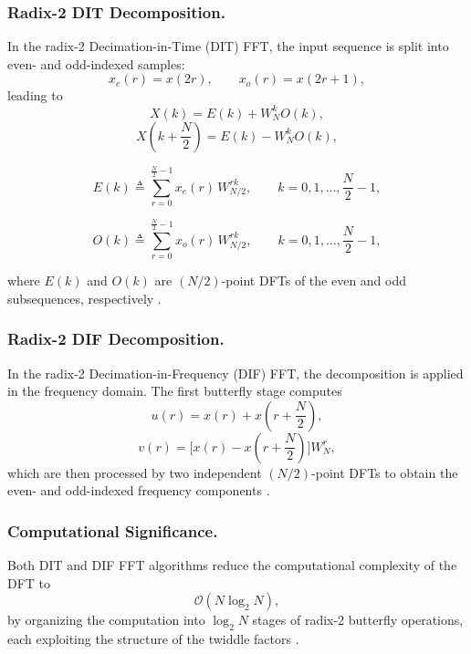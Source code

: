 \subsubsection{Radix-2 DIT Decomposition.}
In the radix-2 Decimation-in-Time (DIT) FFT, the input sequence is split into even- and odd-indexed samples:
\begin{equation}
x_e(r) = x(2r), \qquad
x_o(r) = x(2r+1),
\label{eq:dit_even_odd}
\end{equation}
leading to
\begin{equation}
X(k) = E(k) + W_N^k O(k),
\label{eq:dit_basic}
\end{equation}
\begin{equation}
X\!\left(k+\frac{N}{2}\right) = E(k) - W_N^k O(k),
\label{eq:dit_basic_2}
\end{equation}

\begin{equation}
E(k) \triangleq \sum_{r=0}^{\frac{N}{2}-1} x_e(r)\, W_{N/2}^{rk},
\qquad k = 0,1,\dots,\frac{N}{2}-1,
\label{eq:E_def}
\end{equation}

\begin{equation}
O(k) \triangleq \sum_{r=0}^{\frac{N}{2}-1} x_o(r)\, W_{N/2}^{rk},
\qquad k = 0,1,\dots,\frac{N}{2}-1,
\label{eq:O_def}
\end{equation}

where $E(k)$ and $O(k)$ are $(N/2)$-point DFTs of the even and odd subsequences, respectively \cite{proakis_fft}.

\subsubsection{Radix-2 DIF Decomposition.}
In the radix-2 Decimation-in-Frequency (DIF) FFT, the decomposition is applied in the frequency domain. The first butterfly stage computes
\begin{equation}
u(r) = x(r) + x\!\left(r+\frac{N}{2}\right),
\label{eq:dif_sum}
\end{equation}
\begin{equation}
v(r) = \big[x(r) - x\!\left(r+\frac{N}{2}\right)\big] W_N^{r},
\label{eq:dif_diff}
\end{equation}
which are then processed by two independent $(N/2)$-point DFTs to obtain the even- and odd-indexed frequency components \cite{proakis_fft}.

\subsubsection{Computational Significance.}
Both DIT and DIF FFT algorithms reduce the computational complexity of the DFT to
\begin{equation}
\mathcal{O}(N \log_2 N),
\end{equation}
by organizing the computation into $\log_2 N$ stages of radix-2 butterfly operations, each exploiting the structure of the twiddle factors \cite{proakis_fft}.


